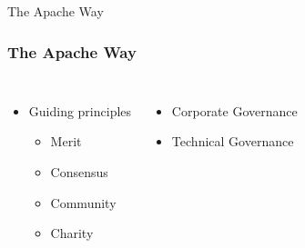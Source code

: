 \documentclass[aspectratio=169,11pt,hyperref={colorlinks=true}]{beamer}
\begin{document}
\begin{frame}[c]
  \begin{center}
      \color{white}
      \Huge The Apache Way
  \end{center}
\end{frame}


\begin{frame}
  \frametitle{The Apache Way}
  \begin{columns}
    \begin{itemize}
      \item{Guiding principles}
      \begin{itemize}
          \item{Merit}
          \item{Consensus}
          \item{Community}
          \item{Charity}
      \end{itemize}
    \end{itemize}
    \begin{itemize}
        \item{Corporate Governance}
        \item{Technical Governance}
    \end{itemize}
  \end{columns}
\end{frame}

\end{document}
